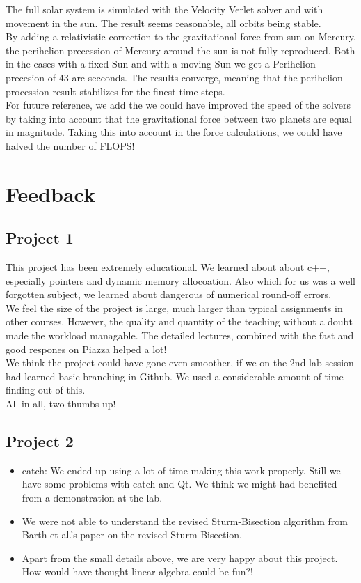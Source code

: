 \documentclass{article}
\begin{document}
The full solar system is simulated with the Velocity Verlet solver and with movement in the sun. The result seems reasonable, all orbits being stable.\\

By adding a relativistic correction to the gravitational force from sun on Mercury, the perihelion precession of Mercury around the sun is not fully reproduced. Both in the cases with a fixed Sun and with a moving Sun we get a Perihelion precesion of 43 arc secconds. The results converge, meaning that the perihelion procession result stabilizes for the finest time steps. \\

For future reference, we add the we could have improved the speed of the solvers by taking into account that the gravitational force between two planets are equal in magnitude. Taking this into account in the force calculations, we could have halved the number of FLOPS!


\section{Feedback}
\subsection{Project 1}
This project has been extremely educational. We learned about about c++, especially pointers and dynamic memory allocoation. Also which for us was a well forgotten subject, we learned about dangerous of numerical round-off errors. \\

We feel the size of the project is large, much larger than typical assignments in other courses. However, the quality and quantity of the teaching without a doubt made the workload managable. The detailed lectures, combined with the fast and good respones on Piazza helped a lot!\\

We think the project could have gone even smoother, if we on the 2nd lab-session had learned basic branching in Github. We used a considerable amount of time finding out of this.\\

All in all, two thumbs up!

\subsection{Project 2}
\begin{itemize}
	\item  catch: We ended up using a lot of time making this work properly. Still we have some problems with catch and Qt. We think we might had benefited from a demonstration at the lab.
	
	\item We were not able to understand the revised Sturm-Bisection algorithm from Barth et al.'s \cite{barth} paper on the revised Sturm-Bisection. 
	
	\item Apart from the small details above, we are very happy about this project. How would have thought linear algebra could be fun?!
\end{itemize}
\end{document}
